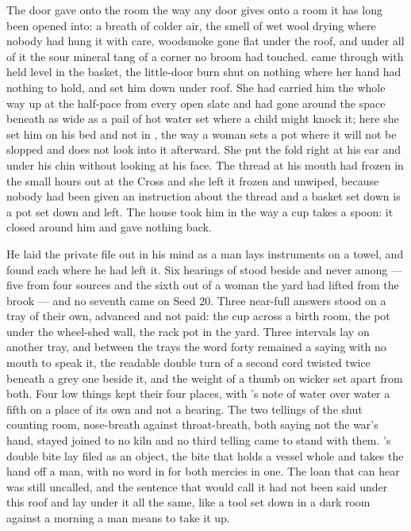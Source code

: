 The door gave onto the room the way any door gives onto a room it has long been opened into: a breath of colder air, the smell of wet wool drying where nobody had hung it with care, woodsmoke gone flat under the roof, and under all of it the sour mineral tang of a corner no broom had touched.  came through with  held level in the basket, the little-door burn shut on nothing where her hand had nothing to hold, and set him down under  roof. She had carried him the whole way up at the half-pace from every open slate and had gone around the space beneath  as wide as a pail of hot water set where a child might knock it; here she set him on his bed and not in , the way a woman sets a pot where it will not be slopped and does not look into it afterward. She put the fold right at his ear and under his chin without looking at his face. The thread at his mouth had frozen in the small hours out at the Cross and she left it frozen and unwiped, because nobody had been given an instruction about the thread and a basket set down is a pot set down and left. The house took him in the way a cup takes a spoon: it closed around him and gave nothing back.

He laid the private file out in his mind as a man lays instruments on a towel, and found each where he had left it. Six hearings of  stood beside and never among --- five from four sources and the sixth out of a woman the yard had lifted from the brook --- and no seventh came on Seed 20. Three near-full answers stood on a tray of their own, advanced and not paid: the cup across a birth room, the pot under the wheel-shed wall, the rack pot in the yard. Three intervals lay on another tray, and between the trays the word forty remained a saying with no mouth to speak it, the readable double turn of a second cord twisted twice beneath a grey one beside it, and the weight of a thumb on wicker set apart from both. Four low things kept their four places, with 's note of water over water a fifth on a place of its own and not a hearing. The two tellings of the shut counting room, nose-breath against throat-breath, both saying not the war's hand, stayed joined to no kiln and no third telling came to stand with them. 's double bite lay filed as an object, the bite that holds a vessel whole and takes the hand off a man, with no word in  for both mercies in one. The loan that can hear was still uncalled, and the sentence that would call it had not been said under this roof and lay under it all the same, like a tool set down in a dark room against a morning a man means to take it up.

